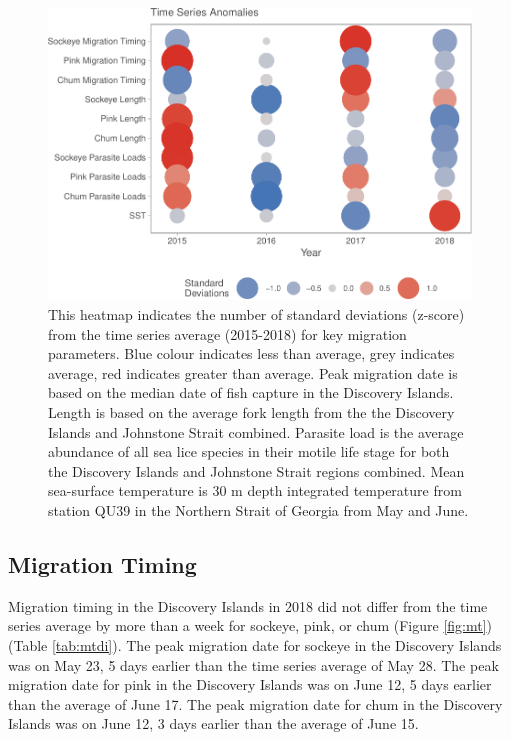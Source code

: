 \documentclass[fleqn,10pt]{wlpeerj} %
\begin{document}
\begin{figure}[H]
\includegraphics[width=0.9\linewidth]{peer_j_migration_dynamics_files/figure-latex/heatmap-1} \caption{This heatmap indicates the number of standard deviations (z-score) from the time series average (2015-2018) for key migration parameters. Blue colour indicates less than average, grey indicates average, red indicates greater than average. Peak migration date is based on the median date of fish capture in the Discovery Islands. Length is based on the average fork length from the the Discovery Islands and Johnstone Strait combined. Parasite load is the average abundance of all sea lice species in their motile life stage for both the Discovery Islands and Johnstone Strait regions combined. Mean sea-surface temperature is 30 m depth integrated temperature from station QU39 in the Northern Strait of Georgia from May and June.}\label{fig:heatmap}
\end{figure}

\subsection*{Migration Timing}\label{migration-timing}

Migration timing in the Discovery Islands in 2018 did not differ from
the time series average by more than a week for sockeye, pink, or chum
(Figure \ref{fig:mt}) (Table \ref{tab:mtdi}). The peak migration date
for sockeye in the Discovery Islands was on May 23, 5 days earlier than
the time series average of May 28. The peak migration date for pink in
the Discovery Islands was on June 12, 5 days earlier than the average of
June 17. The peak migration date for chum in the Discovery Islands was
on June 12, 3 days earlier than the average of June 15.
\end{document}
